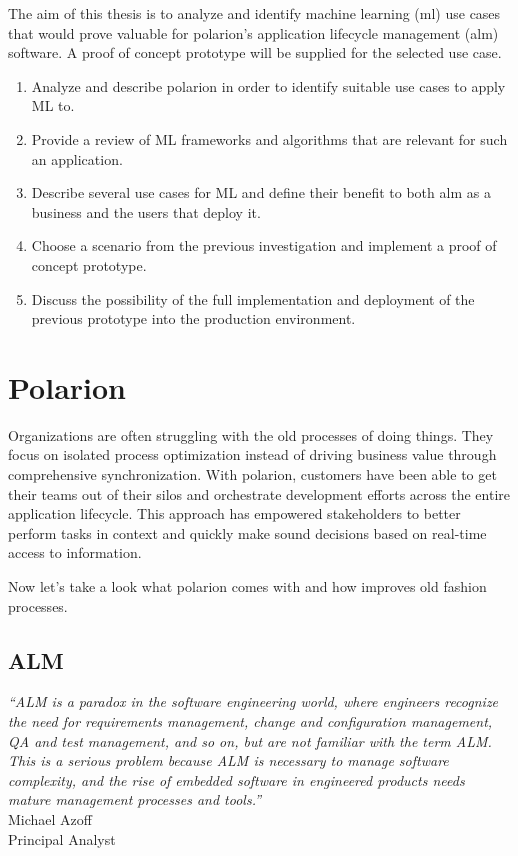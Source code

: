 \documentclass[thesis=M,english]{FITthesis}[2012/06/26]
\begin{document}
The aim of this thesis is to analyze and identify machine learning (\acrshort{ml}) use cases that would prove valuable for \acrshort{polarion}’s application lifecycle management (\acrshort{alm}) software. A proof of concept prototype will be supplied for the selected use case.

\begin{enumerate}[nosep]
	\item Analyze and describe \acrshort{polarion} in order to identify suitable use cases to apply ML to. 
	\item Provide a review of ML frameworks and algorithms that are relevant for such an application.
	\item Describe several use cases for ML and define their benefit to both \acrshort{alm} as a business and the users that deploy it.
	\item Choose a scenario from the previous investigation and implement a proof of concept prototype.
	\item Discuss the possibility of the full implementation and deployment of the previous prototype into the production environment.
\end{enumerate}

\chapter{Polarion}

Organizations are often struggling with the old processes of doing things. They focus on isolated process optimization instead of driving
business value through comprehensive synchronization. With \acrshort{polarion}, customers have been able to get their teams out of their silos and orchestrate development efforts across the entire application lifecycle. This approach has empowered stakeholders to better perform tasks in context and quickly make sound decisions based on real-time access to information.

Now let's take a look what \acrshort{polarion} comes with and how improves old fashion processes.

\section{ALM}

\begin{center}
	\textit{“ALM is a paradox in the software engineering
		world, where engineers recognize
		the need for requirements management,
		change and configuration management, QA
		and test management, and so on, but are
		not familiar with the term ALM. This is a
		serious problem because ALM is necessary
		to manage software complexity, and the rise
		of embedded software in engineered products
		needs mature management processes
		and tools.”}\\
	Michael Azoff\\
	Principal Analyst\\
\end{center}
\end{document}
